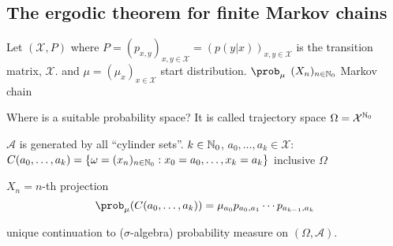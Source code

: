 \documentclass[mfit.tex]{subfiles}
\begin{document}
\subsection{The ergodic theorem for finite Markov chains}

Let $(\mathcal{X},P)$ where $P = (p_{x,y})_{x,y\in \mathcal{X}} = (p(y|x))_{x,y\in \mathcal{X}}$ is the transition matrix, $\mathcal{X}$.
and $\mu = (\mu_x)_{x \in \mathcal{X}}$ start distribution. $\prob_\mu$
$(X_n)_{n \in \mathbb{N}_0}$ Markov chain

Where is a suitable probability space?
It is called trajectory space $\Omega = \mathcal{X}^{\mathbb{N}_0}$

$\mathcal{A}$ is generated by all \enquote{cylinder sets}.
$k \in \mathbb{N}_0$, $a_0,\dots,a_k \in \mathcal{X}$: $C(a_0,\dots,a_k) = \{ \omega = (x_n)_{n \in \mathbb{N}_0}: x_0 = a_0,\dots,x_k=a_k \}$
inclusive $\Omega$

$X_n = n$-th projection
\[ \prob_\mu(C(a_0,\dots,a_k)) = \mu_{a_0} p_{a_0,a_1} \cdots p_{a_{k-1},a_k} \]

unique continuation to ($\sigma$-algebra) probability measure on $(\Omega,\mathcal{A})$.
\end{document}
